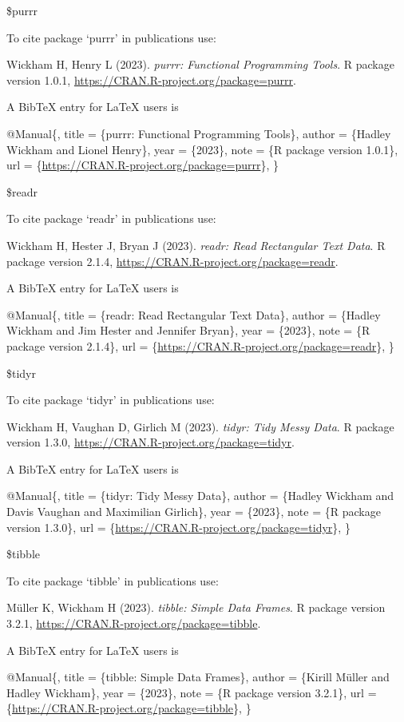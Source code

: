 \documentclass[
]{article}
\begin{document}
\$purrr

To cite package `purrr' in publications use:

Wickham H, Henry L (2023). \emph{purrr: Functional Programming Tools}. R
package version 1.0.1, \url{https://CRAN.R-project.org/package=purrr}.

A BibTeX entry for LaTeX users is

@Manual\{, title = \{purrr: Functional Programming Tools\}, author =
\{Hadley Wickham and Lionel Henry\}, year = \{2023\}, note = \{R package
version 1.0.1\}, url =
\{\url{https://CRAN.R-project.org/package=purrr}\}, \}

\$readr

To cite package `readr' in publications use:

Wickham H, Hester J, Bryan J (2023). \emph{readr: Read Rectangular Text
Data}. R package version 2.1.4,
\url{https://CRAN.R-project.org/package=readr}.

A BibTeX entry for LaTeX users is

@Manual\{, title = \{readr: Read Rectangular Text Data\}, author =
\{Hadley Wickham and Jim Hester and Jennifer Bryan\}, year = \{2023\},
note = \{R package version 2.1.4\}, url =
\{\url{https://CRAN.R-project.org/package=readr}\}, \}

\$tidyr

To cite package `tidyr' in publications use:

Wickham H, Vaughan D, Girlich M (2023). \emph{tidyr: Tidy Messy Data}. R
package version 1.3.0, \url{https://CRAN.R-project.org/package=tidyr}.

A BibTeX entry for LaTeX users is

@Manual\{, title = \{tidyr: Tidy Messy Data\}, author = \{Hadley Wickham
and Davis Vaughan and Maximilian Girlich\}, year = \{2023\}, note = \{R
package version 1.3.0\}, url =
\{\url{https://CRAN.R-project.org/package=tidyr}\}, \}

\$tibble

To cite package `tibble' in publications use:

Müller K, Wickham H (2023). \emph{tibble: Simple Data Frames}. R package
version 3.2.1, \url{https://CRAN.R-project.org/package=tibble}.

A BibTeX entry for LaTeX users is

@Manual\{, title = \{tibble: Simple Data Frames\}, author = \{Kirill
Müller and Hadley Wickham\}, year = \{2023\}, note = \{R package version
3.2.1\}, url = \{\url{https://CRAN.R-project.org/package=tibble}\}, \}
\end{document}
